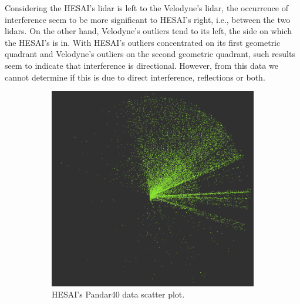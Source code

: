 Considering the HESAI's \ac{lidar} is left to the Velodyne's \ac{lidar}, the occurrence of interference seem to be more significant to HESAI's right, i.e., between the two \acp{lidar}. On the other hand, Velodyne's outliers tend to its left, the side on which the HESAI's is in. With HESAI's outliers concentrated on its first geometric quadrant and Velodyne's outliers on the second geometric quadrant, such results seem to indicate that interference is directional. However, from this data we cannot determine if this is due to direct interference, reflections or both.

\begin{figure}[ht!]
	\centering
	\begin{subfigure}[t]{0.45\textwidth}
		\includegraphics[width=\textwidth]{img/bosch/pandar40.png}
		\caption{HESAI's Pandar40 data scatter plot.}
		\label{fig:bosch-pandar40}
	\end{subfigure}
	\qquad
	\begin{subfigure}[t]{0.45\textwidth}

\end{subfigure}
\end{figure}
